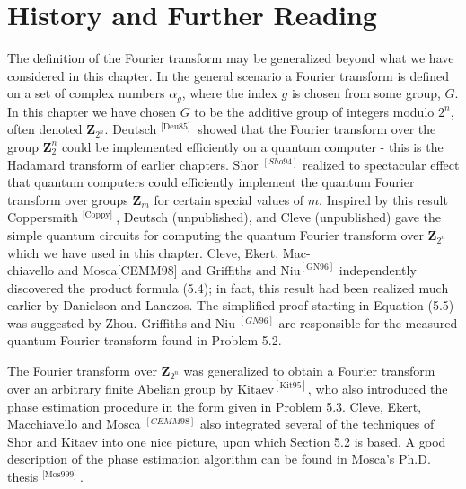 \section{History and Further Reading}
The definition of the Fourier transform may be generalized beyond what we have considered in this chapter. In the general scenario a Fourier transform is defined on a set of complex numbers $\alpha_{g}$, where the index $g$ is chosen from some group, $G$. In this chapter we have chosen $G$ to be the additive group of integers modulo $2^{n}$, often denoted $\mathbf{Z}_{2^{n}}$. Deutsch ${ }^{[\text {Deu85] }}$ showed that the Fourier transform over the group $\mathbf{Z}_{2}^{n}$ could be implemented efficiently on a quantum computer - this is the Hadamard transform of earlier chapters. Shor ${ }^{[S h o 94]}$ realized to spectacular effect that quantum computers could efficiently implement the quantum Fourier transform over groups $\mathbf{Z}_{m}$ for certain special values of $m$. Inspired by this result Coppersmith ${ }^{[\text {Coppy] }}$, Deutsch (unpublished), and Cleve (unpublished) gave the simple quantum circuits for computing the quantum Fourier transform over $\mathbf{Z}_{2^{n}}$ which we have used in this chapter. Cleve, Ekert, Mac-\\
chiavello and Mosca[CEMM98] and Griffiths and $\mathrm{Niu}^{[\mathrm{GN} 96]}$ independently discovered the product formula (5.4); in fact, this result had been realized much earlier by Danielson and Lanczos. The simplified proof starting in Equation (5.5) was suggested by Zhou. Griffiths and Niu ${ }^{[G N 96]}$ are responsible for the measured quantum Fourier transform found in Problem 5.2.

The Fourier transform over $\mathbf{Z}_{2^{n}}$ was generalized to obtain a Fourier transform over an arbitrary finite Abelian group by $\mathrm{Kitaev}^{[\mathrm{Kit} 95]}$, who also introduced the phase estimation procedure in the form given in Problem 5.3. Cleve, Ekert, Macchiavello and Mosca ${ }^{[C E M M 98]}$ also integrated several of the techniques of Shor and Kitaev into one nice picture, upon which Section 5.2 is based. A good description of the phase estimation algorithm can be found in Mosca's Ph.D. thesis ${ }^{[\text {Mos999] }}$.

